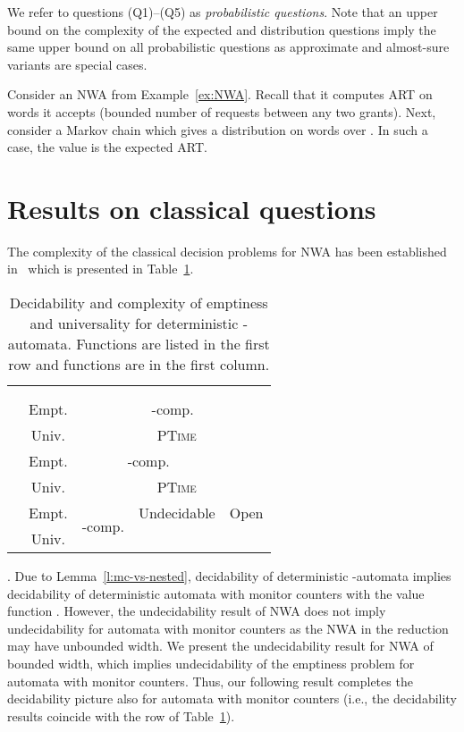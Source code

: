 \documentclass{lmcs}
\newcommand{\PTIME}{\textsc{PTime}{}}
\begin{document}
\noindent
We refer to questions (Q1)--(Q5) as \emph{probabilistic questions}. Note that an upper bound on the complexity of the expected and distribution questions imply the same upper bound on all probabilistic questions as approximate and almost-sure variants are special cases.

\begin{exa}
Consider an NWA  from Example~\ref{ex:NWA}. Recall that it computes ART on words it accepts (bounded number of requests between any two grants).
Next, consider a Markov chain  which gives a distribution on words over .
In such a case, the value  is the expected ART\@.
\end{exa}



\section{Results on classical questions}
	\smallskip{}
The complexity of the classical decision problems for NWA
has been established in~\cite{nested} which is presented in Table~\ref{tab1}.
\begin{table}[t]
\centering
\def\tabcolsep{5pt}
\begin{tabular}{|c|c|c|c|c|} \hline \multicolumn{2}{|c|}{}& &  & \multirow{2}{*}{} \\
\multicolumn{2}{|c|}{}&  &   & \\
\hline  &Empt.&
\multicolumn{3}{|c|}{ {-comp.}}  \\
\cline{2-2}
\cline{4-4}
 &Univ.&  &\PTIME&  \\
\hline \multirow{2}{*}{} & Empt. &
\multicolumn{2}{|c|}{ {-comp.}} &
\multirow{2}{*}{ } \\
\cline{2-2}
\cline{4-4}
&Univ. & &\PTIME&    \\
\hline \multirow{2}{*}{} & Empt. & \multirow{2}{*}{-comp.}  & Undecidable & Open \\
\cline{2-2}
\cline{4-4}
& Univ. &  &   &  \\
\hline \end{tabular}
\caption{Decidability and complexity of emptiness and universality for deterministic -automata.
Functions  are listed in the first row and functions  are in the first column.
}\label{tab1}
\end{table}

\smallskip{}.
Due to Lemma~\ref{l:mc-vs-nested},
decidability of deterministic -automata implies decidability of
deterministic automata with monitor counters with the value function .
However, the undecidability result of NWA does not imply undecidability for
automata with monitor counters as the NWA in the reduction may have unbounded width.
We present the undecidability result for NWA of bounded width, which implies undecidability of the emptiness problem for automata with monitor counters.
Thus, our following result completes the decidability picture also for automata with monitor counters
(i.e., the decidability results coincide with the  row of Table~\ref{tab1}).
\end{document}
